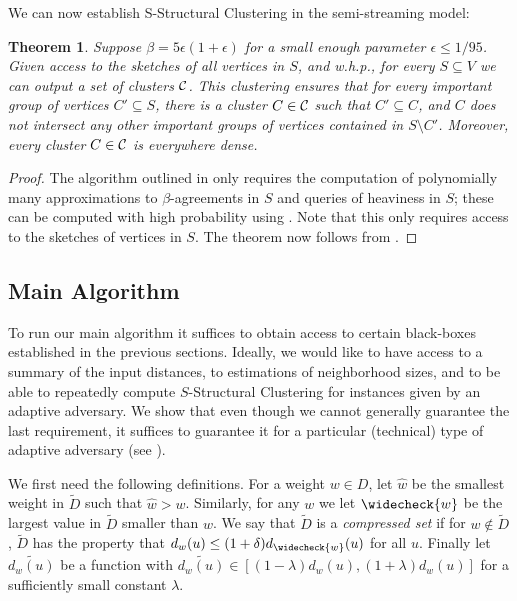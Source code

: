 \documentclass{article}
\newtheorem{theorem}{Theorem}
\begin{document}
We can now establish S-Structural Clustering in the semi-streaming model:
\begin{theorem} \label{lem:horizontal}
    Suppose $\beta = 5\epsilon(1+\epsilon)$ for a small enough parameter $\epsilon \leq 1/95$.
    Given access to the sketches of all vertices in $S$, and w.h.p.,
    for every $S \subseteq V$
    we can output a set of clusters $\mathcal{C}$. This clustering ensures that for every important group of vertices $C' \subseteq S$, there is a cluster $C \in \mathcal{C}$ such that $C' \subseteq C$, and $C$ does not intersect any other important groups of vertices contained in $S \setminus C'$. Moreover, every
    cluster $C \in \mathcal{C}$ is everywhere dense. 
\end{theorem}
\begin{proof}
The algorithm outlined in  only requires the computation of polynomially many approximations to $\beta$-agreements in $S$ and queries of heaviness in $S$; these can be computed with high probability using .
Note that this only requires access to the sketches of vertices in $S$.
The theorem now follows from .
\end{proof}


\subsection{Main Algorithm}
\label{section:algorithm}

To run our main algorithm it suffices to obtain access to certain black-boxes established in the previous sections.
Ideally, we would like to have access to a summary of the input distances, to estimations of neighborhood sizes, and to be able to repeatedly compute $S$-Structural Clustering for instances given by an adaptive adversary.
We show that even though we cannot generally guarantee the last requirement, it suffices to guarantee it for a particular (technical) type of adaptive adversary (see ).

We first need the following definitions.
For a weight $w \in D$, let $\widehat{w}$ be the smallest weight in $\widetilde{D}$ such that $\widehat{w}>w$.
Similarly, for any $w$ we let $\widecheck{w}$ be the largest value in $\widetilde{D}$ smaller than $w$.
We say that $\widetilde{D}$ is a \emph{compressed set} if for $w\not \in \widetilde{D}$, $\widetilde{D}$ has the property that $d_w(u) \le (1+\delta) d_{\widecheck{w}}(u)$ for all $u$.
Finally let $\widetilde{d_w(u)}$ be a function with $\widetilde{d_w(u)}\in [(1-\lambda)d_w(u), (1+\lambda)d_w(u)]$ for a sufficiently small constant $\lambda$.
\end{document}
